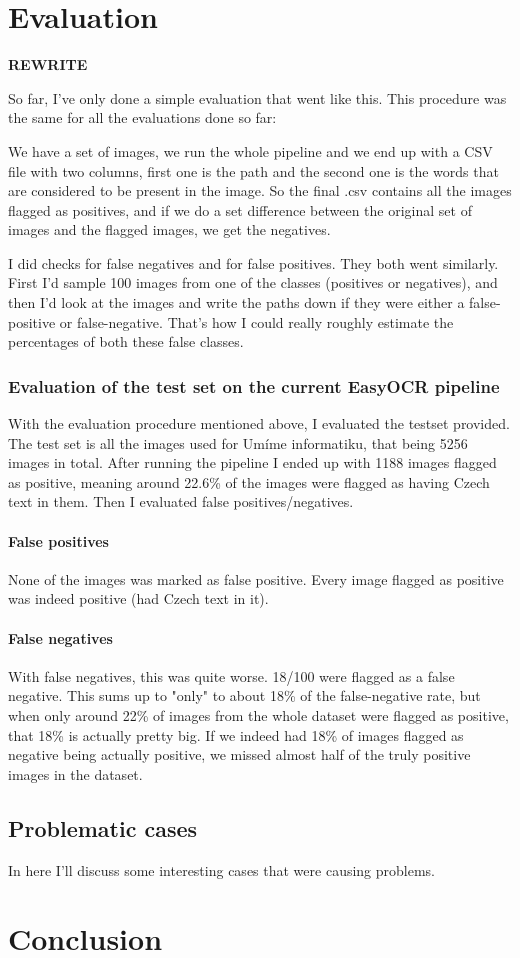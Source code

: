 \documentclass[
  digital,     %
  oneside,     %
  nosansbold,  %
  nocolorbold, %
  nolof,         %
  nolot,         %
]{fithesis4}
\begin{document}
\chapter{Evaluation}\label{chap:evaluation}

\textbf{REWRITE}

So far, I've only done a simple evaluation that went like this. This procedure was the same for all the evaluations done so far:

We have a set of images, we run the whole pipeline and we end up with a CSV file with two columns, first one is the path and the second one is the words that are considered to be present in the image. So the final .csv contains all the images flagged as positives, and if we do a set difference between the original set of images and the flagged images, we get the negatives.

I did checks for false negatives and for false positives. They both went similarly. First I'd sample 100 images from one of the classes (positives or negatives), and then I'd look at the images and write the paths down if they were either a false-positive or false-negative. That's how I could really roughly estimate the percentages of both these false classes.

\subsection{Evaluation of the test set on the current EasyOCR pipeline}

With the evaluation procedure mentioned above, I evaluated the testset provided. The test set is all the images used for Umíme informatiku, that being 5256 images in total. After running the pipeline I ended up with 1188 images flagged as positive, meaning around 22.6\% of the images were flagged as having Czech text in them.
Then I evaluated false positives/negatives.

\subsubsection{False positives}
None of the images was marked as false positive. Every image flagged as positive was indeed positive (had Czech text in it).

\subsubsection{False negatives}
With false negatives, this was quite worse. 18/100 were flagged as a false negative. This sums up to "only" to about 18\% of the false-negative rate, but when only around 22\% of images from the whole dataset were flagged as positive, that 18\% is actually pretty big. If we indeed had 18\% of images flagged as negative being actually positive, we missed almost half of the truly positive images in the dataset.

\section{Problematic cases}

In here I'll discuss some interesting cases that were causing problems.

\chapter{Conclusion}
\end{document}
